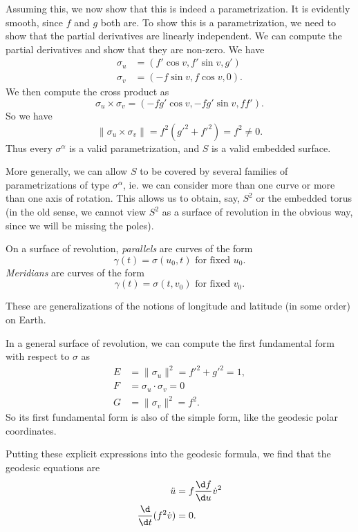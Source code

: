 \documentclass[a4paper]{article}
\begin{document}
Assuming this, we now show that this is indeed a parametrization. It is evidently smooth, since $f$ and $g$ both are. To show this is a parametrization, we need to show that the partial derivatives are linearly independent. We can compute the partial derivatives and show that they are non-zero. We have
\begin{align*}
  \sigma_u &= (f' \cos v, f'\sin v, g')\\
  \sigma_v &= (-f \sin v, f \cos v, 0).
\end{align*}
We then compute the cross product as
\[
  \sigma_u \times \sigma_v = (-fg' \cos v, -fg' \sin v, ff').
\]
So we have
\[
  \|\sigma_u \times \sigma_v\| = f^2 (g'^2 + f'^2) = f^2 \not= 0.
\]
Thus every $\sigma^\alpha$ is a valid parametrization, and $S$ is a valid embedded surface.

More generally, we can allow $S$ to be covered by several families of parametrizations of type $\sigma^\alpha$, ie. we can consider more than one curve or more than one axis of rotation. This allows us to obtain, say, $S^2$ or the embedded torus (in the old sense, we cannot view $S^2$ as a surface of revolution in the obvious way, since we will be missing the poles).

\begin{defi}[Parallels]
  On a surface of revolution, \emph{parallels} are curves of the form
  \[
    \gamma(t) = \sigma(u_0, t)\text{ for fixed }u_0.
  \]
  \emph{Meridians} are curves of the form
  \[
    \gamma(t) = \sigma(t, v_0)\text{ for fixed }v_0.
  \]
\end{defi}
These are generalizations of the notions of longitude and latitude (in some order) on Earth.

In a general surface of revolution, we can compute the first fundamental form with respect to $\sigma$ as
\begin{align*}
  E &= \|\sigma_u\|^2 = f'^2 + g'^2 = 1,\\
  F &= \sigma_u \cdot \sigma_v = 0\\
  G &= \|\sigma_v\|^2 = f^2.
\end{align*}
So its first fundamental form is also of the simple form, like the geodesic polar coordinates.

Putting these explicit expressions into the geodesic formula, we find that the geodesic equations are
\begin{align*}
  \ddot{u} &= f \frac{\d f}{\d u} \dot{v}^2\\
  \frac{\d}{\d t} (f^2 \dot{v}) &= 0.
\end{align*}
\end{document}
